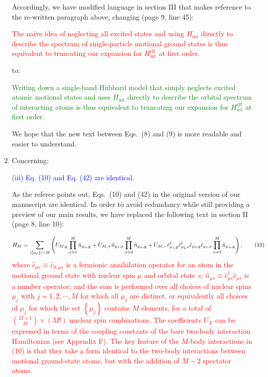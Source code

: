 \documentclass[preprint]{revtex4-1}
\renewcommand{\t}{\text} %
\newcommand{\p}[1]{\left(#1\right)} %
\renewcommand{\set}[1]{\left\{#1\right\}} %
\newcommand{\g}{\text{g}}
\newcommand{\e}{\text{e}}
\renewcommand{\c}{\hat{c}}
\newcommand{\n}{\hat{n}}
\newcommand{\1}{\mathds{1}}
\newcommand{\blue}[1]{\textcolor{blue}{#1}}
\newcommand{\red}[1]{\textcolor{red}{#1}}
\newcommand{\green}[1]{\textcolor{green}{#1}}
\begin{document}
\begin{enumerate}
  Accordingly, we have modified language in section III that makes
  reference to the re-written paragraph above, changing (page 9, line
  45):

  \red{The naive idea of neglecting all excited states and using
    $H_{\t{int}}$ directly to describe the spectrum of single-particle
    motional ground states is thus equivalent to truncating our
    expansion for $H_{\t{int}}^{\t{eff}}$ at first order.}

  to:

  \green{Writing down a single-band Hubbard model that simply neglects
    excited atomic motional states and uses $H_{\t{int}}$ directly to
    describe the orbital spectrum of interacting atoms is thus
    equivalent to truncating our expansion for $H_{\t{int}}^{\t{eff}}$
    at first order.}

  We hope that the new text between Eqs.~(8) and (9) is more readable
  and easier to understand.


\item Concerning:

  \blue{(iii) Eq. (10) and Eq. (42) are identical.}

  As the referee points out, Eqs.~(10) and (42) in the original
  version of our manuscript are identical.  In order to avoid
  redundancy while still providing a preview of our main results, we
  have replaced the following text in section II (page 8, line 10):

  \red{\begin{align*} H_M = \sum_{\abs{\set{\mu_j}}=M} \p{U_{M,\g}
        \prod_{\alpha=1}^M \n_{\mu_\alpha,\g} + U_{M,+} \n_{\mu_1,\e}
        \prod_{\alpha=2}^M \n_{\mu_\alpha,\g} + U_{M,-}
        \c_{\mu_1,\g}^\dag \c_{\mu_2,\e}^\dag \c_{\mu_2,\g}
        \c_{\mu_1,\e} \prod_{\alpha=3}^M \n_{\mu_\alpha,\g}},
      \tag{10}
    \end{align*}
    where $\c_{\mu s}\equiv\c_{0,\mu s}$ is a fermionic annihilation
    operator for an atom in the motional ground state with nuclear
    spin $\mu$ and orbital state $s$;
    $\n_{\mu s}\equiv \c_{\mu s}^\dag \c_{\mu s}$ is a number
    operator; and the sum is performed over all choices of nuclear
    spins $\mu_j$ with $j=1,2,\cdots,M$ for which all $\mu_j$ are
    distinct, or equivalently all choices of $\mu_j$ for which the set
    $\set{\mu_j}$ contains $M$ elements, for a total of
    ${2I+1\choose M}\times\p{M!}$ nuclear spin combinations.  The
    coefficients $U_X$ can be expressed in terms of the coupling
    constants of the bare two-body interaction Hamiltonian (see
    Appendix F).  The key feature of the $M$-body interactions in (10)
    is that they take a form identical to the two-body interactions
    between motional ground-state atoms, but with the addition of
    $M-2$ spectator atoms.}


\end{enumerate}
\end{document}
